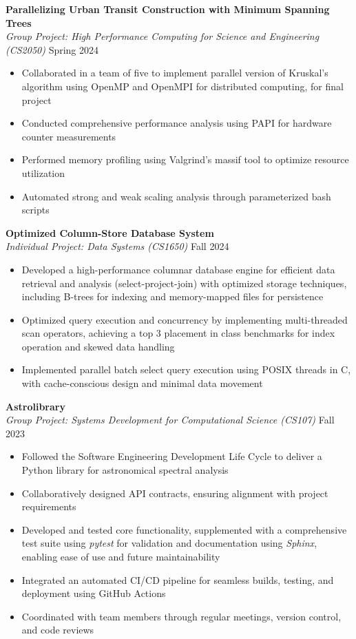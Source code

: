 \documentclass[11pt,a4paper]{article}
\newcommand{\subheading}[1]{\textbf{#1}}
\newcommand{\daterange}[1]{\hfill{#1}}
\begin{document}
\medbreak
\subheading{Parallelizing Urban Transit Construction with Minimum Spanning Trees}\\
\textit{Group Project: High Performance Computing for Science and Engineering (CS2050)} \daterange{Spring 2024}
\begin{itemize}[leftmargin=*,nosep]
    \item Collaborated in a team of five to implement parallel version of Kruskal's algorithm using OpenMP and OpenMPI for distributed computing, for final project
    \item Conducted comprehensive performance analysis using PAPI for hardware counter measurements
    \item Performed memory profiling using Valgrind's massif tool to optimize resource utilization
    \item Automated strong and weak scaling analysis through parameterized bash scripts
\end{itemize}

\medbreak
\subheading{Optimized Column-Store Database System}\\
\textit{Individual Project: Data Systems (CS1650)} \daterange{Fall 2024}
\begin{itemize}[leftmargin=*,nosep]
    \item Developed a high-performance columnar database engine for efficient data retrieval and analysis (select-project-join) with optimized storage techniques, including B-trees for indexing and memory-mapped files for persistence
    \item Optimized query execution and concurrency by implementing multi-threaded scan operators, achieving a top 3 placement in class benchmarks for index operation and skewed data handling
    \item Implemented parallel batch select query execution using POSIX threads in C, with cache-conscious design and minimal data movement
\end{itemize}

\medbreak
\subheading{Astrolibrary} \\
\textit{Group Project: Systems Development for Computational Science (CS107)} \daterange{Fall 2023}
\begin{itemize}[leftmargin=*,nosep]
    \item Followed the Software Engineering Development Life Cycle to deliver a Python library for astronomical spectral analysis
    \item Collaboratively designed API contracts, ensuring alignment with project requirements
    \item Developed and tested core functionality, supplemented with a comprehensive test suite using \textit{pytest} for validation and documentation using \textit{Sphinx}, enabling ease of use and future maintainability
    \item Integrated an automated CI/CD pipeline for seamless builds, testing, and deployment using GitHub Actions
    \item Coordinated with team members through regular meetings, version control, and code reviews
\end{itemize}
\end{document}
